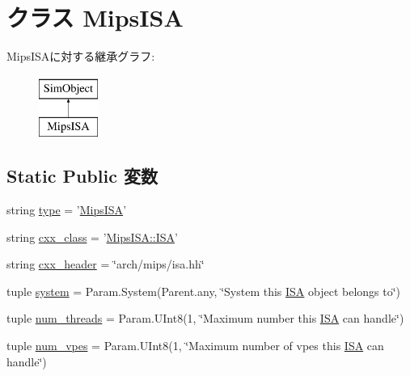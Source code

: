 \hypertarget{classMipsISA_1_1MipsISA}{
\section{クラス MipsISA}
\label{classMipsISA_1_1MipsISA}
}
MipsISAに対する継承グラフ:\begin{figure}[H]
\begin{center}
\leavevmode
\includegraphics[height=2cm]{classMipsISA_1_1MipsISA}
\end{center}
\end{figure}
\subsection*{Static Public 変数}
\begin{DoxyCompactItemize}
\item 
string \hyperlink{classMipsISA_1_1MipsISA_acce15679d830831b0bbe8ebc2a60b2ca}{type} = '\hyperlink{classMipsISA_1_1MipsISA}{MipsISA}'
\item 
string \hyperlink{classMipsISA_1_1MipsISA_a58cd55cd4023648e138237cfc0822ae3}{cxx\_\-class} = '\hyperlink{classMipsISA_1_1ISA}{MipsISA::ISA}'
\item 
string \hyperlink{classMipsISA_1_1MipsISA_a17da7064bc5c518791f0c891eff05fda}{cxx\_\-header} = \char`\"{}arch/mips/isa.hh\char`\"{}
\item 
tuple \hyperlink{classMipsISA_1_1MipsISA_ab737471139f5a296e5b26e8a0e1b0744}{system} = Param.System(Parent.any, \char`\"{}System this \hyperlink{classMipsISA_1_1ISA}{ISA} object belongs to\char`\"{})
\item 
tuple \hyperlink{classMipsISA_1_1MipsISA_a6bede2fa1bbaab86a4a39115b97b8301}{num\_\-threads} = Param.UInt8(1, \char`\"{}Maximum number this \hyperlink{classMipsISA_1_1ISA}{ISA} can handle\char`\"{})
\item 
tuple \hyperlink{classMipsISA_1_1MipsISA_a7a2e9716e2e035df60402d7ecad5f580}{num\_\-vpes} = Param.UInt8(1, \char`\"{}Maximum number of vpes this \hyperlink{classMipsISA_1_1ISA}{ISA} can handle\char`\"{})
\end{DoxyCompactItemize}


